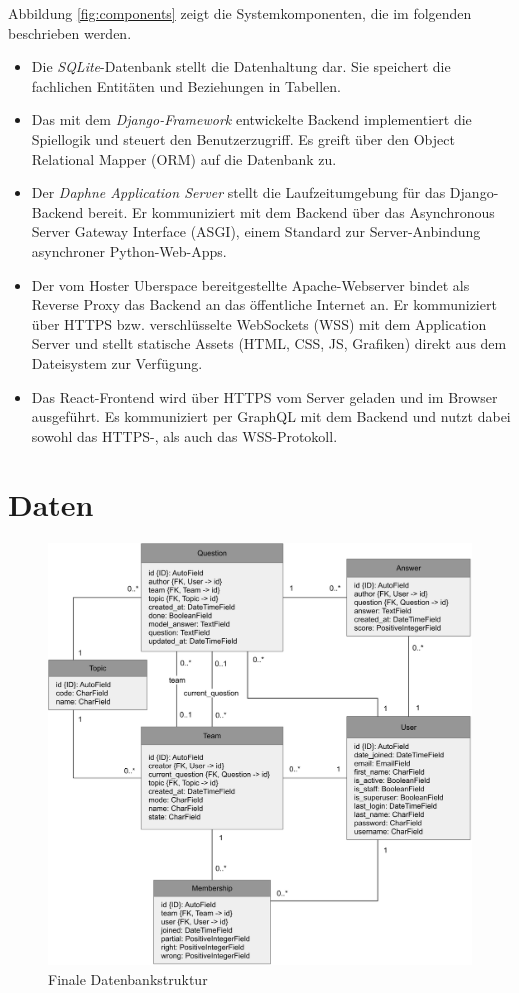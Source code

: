 \documentclass[a4paper,11pt,listof=numbered,glossary=totoc,parskip=half,toc=bib]{scrreprt}
\begin{document}
	Abbildung \ref{fig:components} zeigt die Systemkomponenten, die im folgenden beschrieben werden.
	
	\begin{itemize}
		\item Die \textit{SQLite}-Datenbank stellt die Datenhaltung dar. Sie speichert die fachlichen Entitäten und Beziehungen in Tabellen.
		\item Das mit dem \textit{Django-Framework} entwickelte Backend implementiert die Spiellogik und steuert den Benutzerzugriff. Es greift über den Object Relational Mapper (ORM) auf die Datenbank zu.
		\item Der \textit{Daphne Application Server} stellt die Laufzeitumgebung für das Django-Backend bereit. Er kommuniziert mit dem Backend über das Asynchronous Server Gateway Interface (ASGI), einem Standard zur Server-Anbindung asynchroner Python-Web-Apps.
		\item Der vom Hoster Uberspace bereitgestellte Apache-Webserver bindet als Reverse Proxy das Backend an das öffentliche Internet an. Er kommuniziert über HTTPS bzw. verschlüsselte WebSockets (WSS) mit dem Application Server und stellt statische Assets (HTML, CSS, JS, Grafiken) direkt aus dem Dateisystem zur Verfügung.
		\item Das React-Frontend wird über HTTPS vom Server geladen und im Browser ausgeführt. Es kommuniziert per GraphQL mit dem Backend und nutzt dabei sowohl das HTTPS-, als auch das WSS-Protokoll.
	\end{itemize}
	
	
	\section{Daten}
	
	\begin{figure}
		\centering
		\includegraphics[width=\textwidth]{UML_Datenmodell}
		\caption{Finale Datenbankstruktur}
		\label{fig:database}
	\end{figure}
\end{document}
